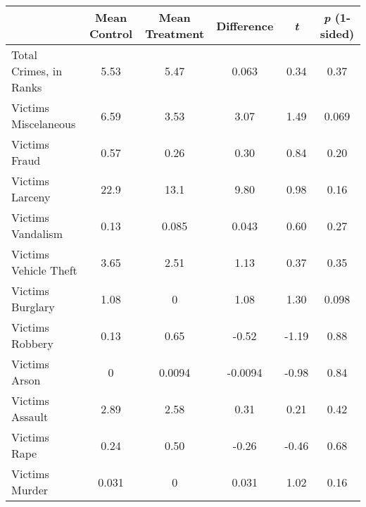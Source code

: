 {
\def\sym#1{\ifmmode^{#1}\else\(^{#1}\)\fi}
\begin{tabular}{l*{1}{ccccc}}
\hline\hline
                    &Mean Control&Mean Treatment&  Difference&  \textit{t}&\textit{p} (1-sided)\\
\hline
Total Crimes, in Ranks&        5.53&        5.47&       0.063&        0.34&        0.37\\
Victims Miscelaneous &        6.59&        3.53&        3.07&        1.49&       0.069\\
Victims Fraud       &        0.57&        0.26&        0.30&        0.84&        0.20\\
Victims Larceny     &        22.9&        13.1&        9.80&        0.98&        0.16\\
Victims Vandalism   &        0.13&       0.085&       0.043&        0.60&        0.27\\
Victims Vehicle Theft &        3.65&        2.51&        1.13&        0.37&        0.35\\
Victims Burglary    &        1.08&           0&        1.08&        1.30&       0.098\\
Victims Robbery     &        0.13&        0.65&       -0.52&       -1.19&        0.88\\
Victims Arson       &           0&      0.0094&     -0.0094&       -0.98&        0.84\\
Victims Assault     &        2.89&        2.58&        0.31&        0.21&        0.42\\
Victims Rape        &        0.24&        0.50&       -0.26&       -0.46&        0.68\\
Victims Murder      &       0.031&           0&       0.031&        1.02&        0.16\\
\hline\hline
\end{tabular}
}
